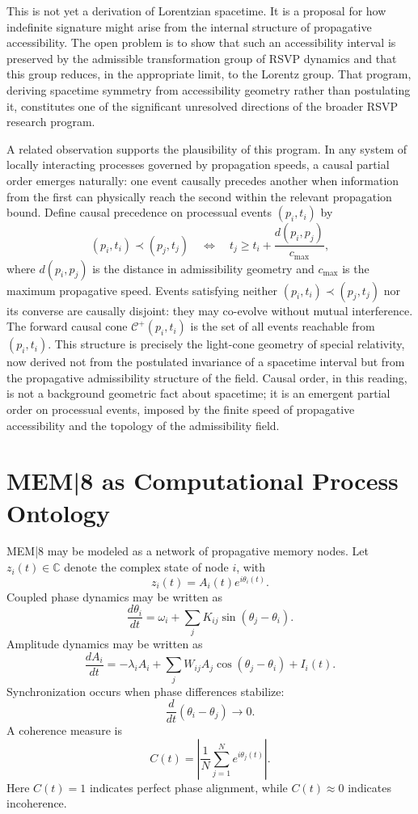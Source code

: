 \documentclass[12pt,a4paper]{article}
\begin{document}
This is not yet a derivation of Lorentzian spacetime. It is a proposal for how indefinite signature might arise from the internal structure of propagative accessibility. The open problem is to show that such an accessibility interval is preserved by the admissible transformation group of RSVP dynamics and that this group reduces, in the appropriate limit, to the Lorentz group. That program, deriving spacetime symmetry from accessibility geometry rather than postulating it, constitutes one of the significant unresolved directions of the broader RSVP research program.

A related observation supports the plausibility of this program. In any system of locally interacting processes governed by propagation speeds, a causal partial order emerges naturally: one event causally precedes another when information from the first can physically reach the second within the relevant propagation bound. Define causal precedence on processual events \((p_i, t_i)\) by
\[
(p_i, t_i) \prec (p_j, t_j)
\quad \Leftrightarrow \quad
t_j \geq t_i + \frac{d(p_i, p_j)}{c_{\max}},
\]
where \(d(p_i, p_j)\) is the distance in admissibility geometry and \(c_{\max}\) is the maximum propagative speed. Events satisfying neither \((p_i, t_i) \prec (p_j, t_j)\) nor its converse are causally disjoint: they may co-evolve without mutual interference. The forward causal cone \(\mathcal{C}^+(p_i, t_i)\) is the set of all events reachable from \((p_i, t_i)\). This structure is precisely the light-cone geometry of special relativity, now derived not from the postulated invariance of a spacetime interval but from the propagative admissibility structure of the field. Causal order, in this reading, is not a background geometric fact about spacetime; it is an emergent partial order on processual events, imposed by the finite speed of propagative accessibility and the topology of the admissibility field.

\section{MEM|8 as Computational Process Ontology}

MEM|8 may be modeled as a network of propagative memory nodes. Let \(z_i(t)\in\mathbb{C}\) denote the complex state of node \(i\), with
\[
z_i(t)=A_i(t)e^{i\theta_i(t)}.
\]
Coupled phase dynamics may be written as
\[
\frac{d\theta_i}{dt}
=
\omega_i
+
\sum_j K_{ij}\sin(\theta_j-\theta_i).
\]
Amplitude dynamics may be written as
\[
\frac{dA_i}{dt}
=
-\lambda_i A_i
+
\sum_j W_{ij}A_j\cos(\theta_j-\theta_i)
+
I_i(t).
\]
Synchronization occurs when phase differences stabilize:
\[
\frac{d}{dt}(\theta_i-\theta_j)\to 0.
\]
A coherence measure is
\[
C(t)=\left|\frac{1}{N}\sum_{j=1}^N e^{i\theta_j(t)}\right|.
\]
Here \(C(t)=1\) indicates perfect phase alignment, while \(C(t)\approx 0\) indicates incoherence.
\end{document}
